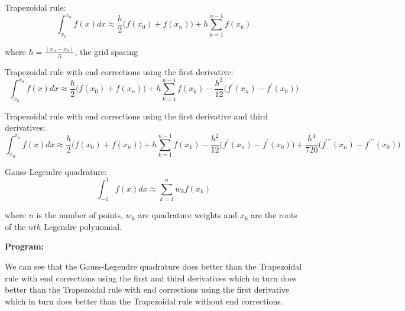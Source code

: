 \documentclass[a4paper,11pt]{report}
\begin{document}
\begin{enumerate}
    Trapezoidal rule:
    \begin{equation*}
    \int_{x_{0}}^{x_{n}} f(x) dx \approx \frac{h}{2} \Big(f(x_{0}) + f(x_{n}) \Big) + h \sum_{k=1}^{n-1} f(x_{k})
    \end{equation*}

    where $h = \displaystyle \frac{(x_{n} - x_{0})}{N}$, the grid spacing

    Trapezoidal rule with end corrections using the first derivative:
    \begin{equation*}
    \int_{x_{0}}^{x_{n}} f(x) dx \approx \frac{h}{2} \Big(f(x_{0}) + f(x_{n}) \Big) + h \sum_{k=1}^{n-1} f(x_{k}) - \frac{h^{2}}{12} \Big(f^{\prime}(x_{n}) - f^{\prime}(x_{0}) \Big)
    \end{equation*}

    Trapezoidal rule with end corrections using the first derivative and third derivatives:
    \begin{equation*}
    \int_{x_{0}}^{x_{n}} f(x) dx \approx \frac{h}{2} \Big(f(x_{0}) + f(x_{n}) \Big) + h \sum_{k=1}^{n-1} f(x_{k}) - \frac{h^{2}}{12} \Big(f^{\prime}(x_{n}) - f^{\prime}(x_{0}) \Big) + \frac{h^{4}}{720} \Big(f^{\prime\prime\prime}(x_{n}) - f^{\prime\prime\prime}(x_{0}) \Big)
    \end{equation*}

    Gauss-Legendre quadrature:
    \begin{equation*}
    \int_{-1}^{1} f(x) dx \approx \sum_{k=1}^{n} w_{k} f(x_{k})
    \end{equation*}

    where $n$ is the number of points, $w_{k}$ are quadrature weights and $x_{k}$ are the roots of the $nth$ Legendre polynomial. 
            
    \pagebreak

    \textbf{Program:}
    

    \begin{figure}[ht!]
    \centering
    \resizebox{0.95\linewidth}{!}{}
    \end{figure}

    

    We can see that the Gauss-Legendre quadrature does better than the Trapezoidal rule with end corrections using the first and 
    third derivatives which in turn does better than the Trapezoidal rule with end corrections using the first derivative which 
    in turn does better than the Trapezoidal rule without end corrections.


\end{enumerate}
\end{document}
